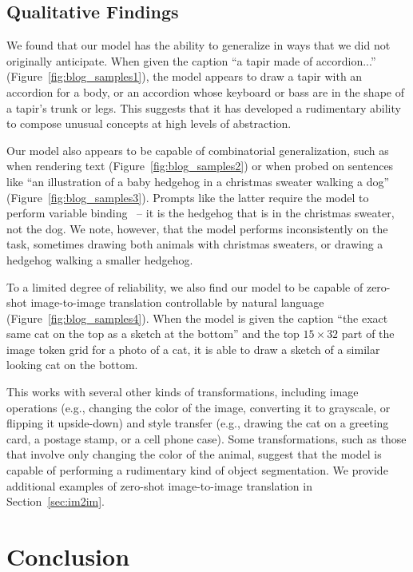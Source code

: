 \documentclass{article}
\begin{document}
\subsection{Qualitative Findings}
\label{sec:qual_findings}

We found that our model has the ability to generalize in ways that we did not originally anticipate. When given the caption ``a tapir made of accordion...'' (Figure~\ref{fig:blog_samples1}), the model appears to draw a tapir with an accordion for a body, or an accordion whose keyboard or bass are in the shape of a tapir's trunk or legs. This suggests that it has developed a rudimentary ability to compose unusual concepts at high levels of abstraction.

Our model also appears to be capable of combinatorial generalization, such as when rendering text (Figure~\ref{fig:blog_samples2}) or when probed on sentences like ``an illustration of a baby hedgehog in a christmas sweater walking a dog'' (Figure~\ref{fig:blog_samples3}). Prompts like the latter require the model to perform variable binding~\cite{smolensky1990tensor,greff2020binding} -- it is the hedgehog that is in the christmas sweater, not the dog. We note, however, that the model performs inconsistently on the task, sometimes drawing both animals with christmas sweaters, or drawing a hedgehog walking a smaller hedgehog.

To a limited degree of reliability, we also find our model to be capable of zero-shot image-to-image translation controllable by natural language (Figure~\ref{fig:blog_samples4}). When the model is given the caption ``the exact same cat on the top as a sketch at the bottom'' and the top $15 \times 32$ part of the image token grid for a photo of a cat, it is able to draw a sketch of a similar looking cat on the bottom. 

This works with several other kinds of transformations, including image operations (e.g., changing the color of the image, converting it to grayscale, or flipping it upside-down) and style transfer (e.g., drawing the cat on a greeting card, a postage stamp, or a cell phone case). Some transformations, such as those that involve only changing the color of the animal, suggest that the model is capable of performing a rudimentary kind of object segmentation. We provide additional examples of zero-shot image-to-image translation in Section~\ref{sec:im2im}.

\section{Conclusion}
\end{document}
